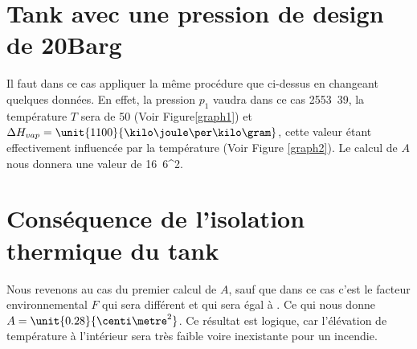 \section{Tank avec une pression de design de \unit{20}{Barg}}

Il faut dans ce cas appliquer la même procédure que ci-dessus en changeant quelques données. En effet, la pression $p_1$ vaudra dans ce cas \unit{2553.39}{\kilo \pascal}, la température $T$ sera de \unit{50}{\celsius} (Voir Figure\ref{graph1}) et $\Delta H_{vap}=\unit{1100}{\kilo \joule \per \kilo \gram}$, cette valeur étant effectivement influencée par la température (Voir Figure \ref{graph2}). Le calcul de $A$ nous donnera une valeur de \unit{16.6}{\centi \metre^2}.

\section{Conséquence de l'isolation thermique du tank}

Nous revenons au cas du premier calcul de $A$, sauf que dans ce cas c'est le facteur environnemental $F$ qui sera différent et qui sera égal à . Ce qui nous donne $A=\unit{0.28}{\centi \metre^2}$. Ce résultat est logique, car l'élévation de température à l'intérieur sera très faible voire inexistante pour un incendie.
